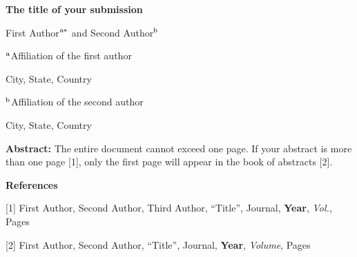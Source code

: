 \documentclass[12pt]{article}
\begin{document}
\centerline{\bf The title of your submission}

\vspace{12pt}

\centerline{ {First Author}$^{\rm a*}$ and {Second Author}$^{\rm b}$}

\vspace{12pt}

\centerline{$^{\rm a}$Affiliation of the first author}
\centerline{City, State, Country}

\vspace{12pt}

\centerline{$^{\rm b}$Affiliation of the second author}
\centerline{City, State, Country}

\vspace{12pt}

\vspace{24pt}

{\bf Abstract:} The entire document cannot exceed one page.  If your
abstract is more than one page [1], only the first page will appear in the book
of abstracts [2].

\vspace{12pt}

\vspace{12pt}

\parindent=0pt
{\bf References}

[1] First Author, Second Author, Third Author, ``Title'', Journal, {\bf Year},
{\em Vol.}, Pages

[2] First Author, Second Author, ``Title'', Journal, {\bf Year},
{\em Volume}, Pages
\end{document}

